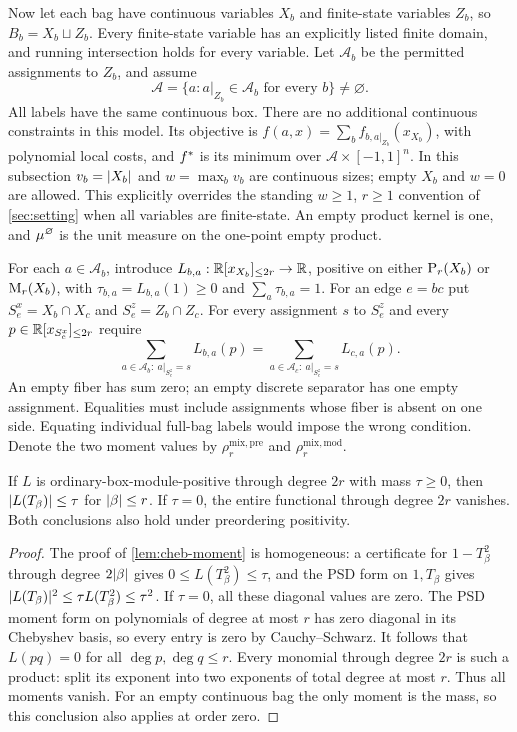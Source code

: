 Now let each bag have continuous variables $X_b$ and finite-state variables
$Z_b$, so $B_b=X_b\sqcup Z_b$. Every finite-state variable has an explicitly
listed finite domain, and running intersection holds for every variable.
Let $\mathcal A_b$ be the permitted assignments to $Z_b$, and assume
\[
 \mathcal A=\{a:a|_{Z_b}\in\mathcal A_b\text{ for every }b\}\ne\varnothing.
\]
All labels have the same continuous box. There are no additional continuous
constraints in this model. Its objective is
$f(a,x)=\sum_bf_{b,a|_{Z_b}}(x_{X_b})$, with polynomial local costs, and
$f^{*}$ is its minimum over $\mathcal A\times[-1,1]^n$.
In this subsection $v_b=\lvert X_b\rvert$ and $w=\max_b v_b$ are continuous sizes;
empty $X_b$ and $w=0$ are allowed. This explicitly overrides the standing
$w\ge1$, $r\ge1$ convention of \cref{sec:setting} when all variables are
finite-state. An empty product kernel is one, and $\mu^\varnothing$
is the unit measure on the one-point empty product.

For each $a\in\mathcal A_b$, introduce
$L_{b,a}:\mathbb{R}[x_{X_b}]_{\le 2r}\to\mathbb{R}$, positive on either
$\mathrm{P}_r(X_b)$ or $\mathrm{M}_r(X_b)$, with
$\tau_{b,a}=L_{b,a}(1)\ge0$ and $\sum_a\tau_{b,a}=1$.
For an edge $e=bc$ put
$S_e^x=X_b\cap X_c$ and $S_e^z=Z_b\cap Z_c$. For every assignment $s$
to $S_e^z$ and every $p\in\mathbb{R}[x_{S_e^x}]_{\le 2r}$ require
\begin{equation}\label{eq:ext-label-separator}
 \sum_{a\in\mathcal A_b:\ a|_{S_e^z}=s}L_{b,a}(p)
 =\sum_{a\in\mathcal A_c:\ a|_{S_e^z}=s}L_{c,a}(p).
\end{equation}
An empty fiber has sum zero; an empty discrete separator has one empty
assignment. Equalities must include assignments whose fiber is absent on
one side. Equating individual full-bag labels would impose the wrong
condition. Denote the two moment values by
$\rho_r^{\mathrm{mix,pre}}$ and $\rho_r^{\mathrm{mix,mod}}$.

\begin{lemma}\label{lem:ext-mass}
If $L$ is ordinary-box-module-positive through degree $2r$ with mass
$\tau\ge0$, then $\lvert L(T_\beta)\rvert\le\tau$ for $\lvert \beta\rvert\le r$.
If $\tau=0$, the entire functional through degree $2r$ vanishes.
Both conclusions also hold under preordering positivity.
\end{lemma}
\begin{proof}
The proof of \cref{lem:cheb-moment} is homogeneous: a certificate for
$1-T_\beta^2$ through degree $2\lvert \beta\rvert$ gives
$0\le L(T_\beta^2)\le\tau$, and the PSD form on $1,T_\beta$ gives
$\lvert L(T_\beta)\rvert^2\le\tau L(T_\beta^2)\le\tau^2$.
If $\tau=0$, all these diagonal values are zero. The PSD moment form on
polynomials of degree at most $r$ has zero diagonal in its Chebyshev basis,
so every entry is zero by Cauchy--Schwarz. It follows that $L(pq)=0$ for
all $\deg p,\deg q\le r$. Every monomial through degree $2r$ is such a
product: split its exponent into two exponents of total degree at most
$r$. Thus all moments vanish. For an empty continuous bag the only moment
is the mass, so this conclusion also applies at order zero.
\end{proof}

